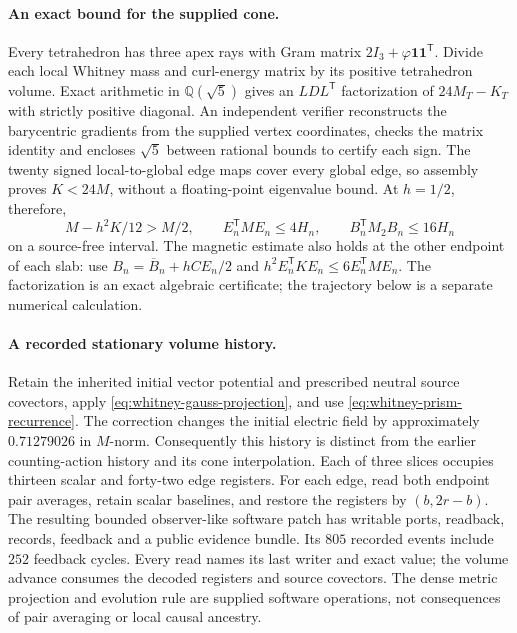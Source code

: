 \paragraph{An exact bound for the supplied cone.}
Every tetrahedron has three apex rays with Gram matrix
\(2I_3+\varphi\mathbf1\mathbf1^{\mathsf T}\).
Divide each local Whitney mass and curl-energy matrix by its positive
tetrahedron volume. Exact arithmetic in \(\mathbb Q(\sqrt5)\) gives an
\(LDL^{\mathsf T}\) factorization of \(24M_T-K_T\) with strictly
positive diagonal. An independent verifier reconstructs the barycentric
gradients from the supplied vertex coordinates, checks the matrix identity
and encloses \(\sqrt5\) between rational bounds to certify each sign.
The twenty signed local-to-global edge maps cover every global edge, so
assembly proves \(K<24M\), without a floating-point eigenvalue bound.
At \(h=1/2\), therefore,
\[
 M-h^2K/12>M/2,\qquad
 E_n^{\mathsf T}ME_n\leq4H_n,\qquad
 B_n^{\mathsf T}M_2B_n\leq16H_n
\]
on a source-free interval. The magnetic estimate also holds at the other
endpoint of each slab: use
\(B_n=\overline B_n+hCE_n/2\) and
\(h^2E_n^{\mathsf T}KE_n\leq6E_n^{\mathsf T}ME_n\).
The factorization is an exact algebraic certificate; the trajectory below
is a separate numerical calculation.

\paragraph{A recorded stationary volume history.}
Retain the inherited initial vector potential and prescribed neutral source
covectors, apply \eqref{eq:whitney-gauss-projection}, and use
\eqref{eq:whitney-prism-recurrence}. The correction changes the initial
electric field by approximately \(0.71279026\) in \(M\)-norm.
Consequently this history is distinct from the earlier counting-action
history and its cone interpolation. Each of three slices occupies thirteen
scalar and forty-two edge registers. For each edge, read both endpoint
pair averages, retain scalar baselines, and restore the registers by
\((b,2r-b)\). The resulting bounded observer-like software patch has
writable ports, readback, records, feedback and a public evidence bundle.
Its \(805\) recorded events include \(252\) feedback cycles. Every
read names its last writer and exact value; the volume advance consumes
the decoded registers and source covectors. The dense metric projection
and evolution rule are supplied software operations, not consequences of
pair averaging or local causal ancestry.

